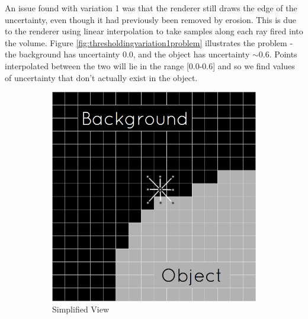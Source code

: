 An issue found with variation 1 was that the renderer still draws the edge of the uncertainty, even though it had previously been removed by erosion. This is due to the renderer using linear interpolation to take samples along each ray fired into the volume. Figure \ref{fig:thresholdingvariation1problem} illustrates the problem - the background has uncertainty 0.0, and the object has uncertainty $\sim$0.6. Points interpolated between the two will lie in the range [0.0-0.6] and so we find values of uncertainty that don't actually exist in the object.

\begin{figure}[h]
  \centering
  \begin{subfigure}[b]{0.481\textwidth}
    \includegraphics[width=\textwidth]{images/thresholding/thresholdvariation1example.png}
    \caption{Simplified View}
    \label{fig:thresholdingvariation1example}
  \end{subfigure}%
  ~ %
  \begin{subfigure}[b]{0.519\textwidth}

\end{subfigure}
\end{figure}
